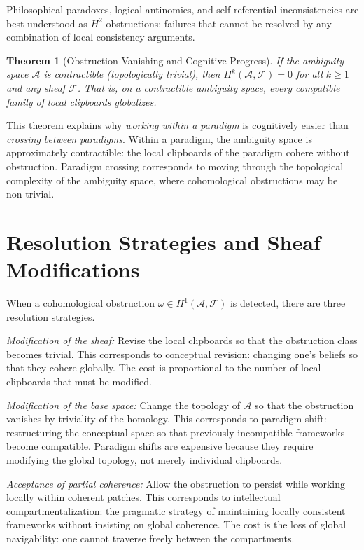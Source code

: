\documentclass[12pt,oneside]{book}
\theoremstyle{plain}
\newtheorem{theorem}{Theorem}[chapter]
\theoremstyle{definition}
\theoremstyle{plain}
\newcommand{\cA}{\mathcal{A}}
\begin{document}
Philosophical paradoxes, logical antinomies, and self-referential inconsistencies are best understood as $H^2$ obstructions: failures that cannot be resolved by any combination of local consistency arguments.

\begin{theorem}[Obstruction Vanishing and Cognitive Progress]
If the ambiguity space $\cA$ is contractible (topologically trivial), then $H^k(\cA, \mathcal{F}) = 0$ for all $k \geq 1$ and any sheaf $\mathcal{F}$. That is, on a contractible ambiguity space, every compatible family of local clipboards globalizes.
\end{theorem}

This theorem explains why \emph{working within a paradigm} is cognitively easier than \emph{crossing between paradigms}. Within a paradigm, the ambiguity space is approximately contractible: the local clipboards of the paradigm cohere without obstruction. Paradigm crossing corresponds to moving through the topological complexity of the ambiguity space, where cohomological obstructions may be non-trivial.

\section{Resolution Strategies and Sheaf Modifications}

When a cohomological obstruction $\omega \in H^1(\cA, \mathcal{F})$ is detected, there are three resolution strategies.

\emph{Modification of the sheaf:} Revise the local clipboards so that the obstruction class becomes trivial. This corresponds to conceptual revision: changing one's beliefs so that they cohere globally. The cost is proportional to the number of local clipboards that must be modified.

\emph{Modification of the base space:} Change the topology of $\cA$ so that the obstruction vanishes by triviality of the homology. This corresponds to paradigm shift: restructuring the conceptual space so that previously incompatible frameworks become compatible. Paradigm shifts are expensive because they require modifying the global topology, not merely individual clipboards.

\emph{Acceptance of partial coherence:} Allow the obstruction to persist while working locally within coherent patches. This corresponds to intellectual compartmentalization: the pragmatic strategy of maintaining locally consistent frameworks without insisting on global coherence. The cost is the loss of global navigability: one cannot traverse freely between the compartments.
\end{document}
